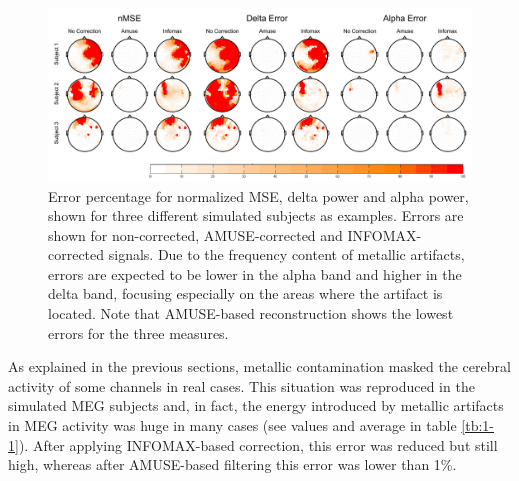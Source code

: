 \begin{figure}[ht!]
\centering
\includegraphics[width=1\textwidth]{Images/fig1-6.png}
\caption{Error percentage for normalized MSE, delta power and alpha power, shown for three different simulated subjects as examples. Errors are shown for non-corrected, AMUSE-corrected and INFOMAX-corrected signals. Due to the frequency content of metallic artifacts, errors are expected to be lower in the alpha band and higher in the delta band, focusing especially on the areas where the artifact is located. Note that AMUSE-based reconstruction shows the lowest errors for the three measures.}
\label{fig:1-6}
\end{figure}  

As explained in the previous sections, metallic contamination masked the cerebral activity of some channels in real cases. This situation was reproduced in the simulated MEG subjects and, in fact, the energy introduced by metallic artifacts in MEG activity was huge in many cases (see values and average in table \ref{tb:1-1}). After applying INFOMAX-based correction, this error was reduced but still high, whereas after AMUSE-based filtering this error was lower than 1\%.


